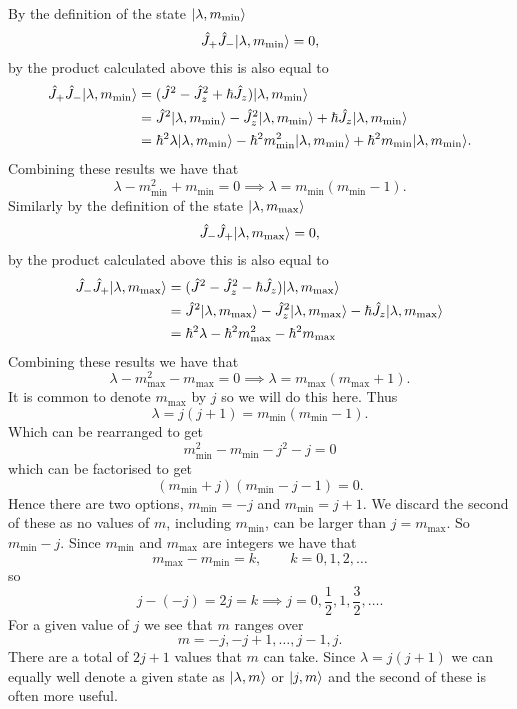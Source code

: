 By the definition of the state \(\vert {\lambda, m_{\min}} \rangle\)
\[\hat{J}_+\hat{J}_-\vert {\lambda, m_{\min}} \rangle = 0,\]
by the product calculated above this is also equal to
\begin{align*}
    \hat{J}_+\hat{J}_-\vert {\lambda, m_{\min}} \rangle &= (\hat{J}^2 - \hat{J}_z^2 + \hbar\hat{J}_z)\vert {\lambda, m_{\min}} \rangle\\
    &= \hat{J}^2\vert {\lambda, m_{\min}} \rangle - \hat{J}_z^2\vert {\lambda, m_{\min}} \rangle + \hbar\hat{J}_z\vert {\lambda, m_{\min}} \rangle\\
    &= \hbar^2\lambda\vert {\lambda, m_{\min}} \rangle - \hbar^2m_{\min}^2\vert {\lambda, m_{\min}} \rangle + \hbar^2m_{\min}\vert {\lambda, m_{\min}} \rangle.\\
\end{align*}
Combining these results we have that
\[\lambda - m_{\min}^2 + m_{\min} = 0 \implies \lambda = m_{\min}(m_{\min} - 1).\]
Similarly by the definition of the state \(\vert {\lambda, m_{\max}} \rangle\)
\[\hat{J}_-\hat{J}_+\vert {\lambda, m_{\max}} \rangle = 0,\]
by the product calculated above this is also equal to
\begin{align*}
    \hat{J}_-\hat{J}_+\vert {\lambda, m_{\max}} \rangle &= (\hat{J}^2 - \hat{J}_z^2 - \hbar\hat{J}_z)\vert {\lambda, m_{\max}} \rangle\\
    &= \hat{J}^2\vert {\lambda, m_{\max}} \rangle - \hat{J}_z^2\vert {\lambda, m_{\max}} \rangle - \hbar\hat{J}_z\vert {\lambda, m_{\max}} \rangle\\
    &= \hbar^2\lambda - \hbar^2m_{\max}^2 - \hbar^2m_{\max}
\end{align*}
Combining these results we have that
\[\lambda - m_{\max}^2 - m_{\max} = 0 \implies \lambda = m_{\max}(m_{\max} + 1).\]
It is common to denote \(m_{\max}\) by \(j\) so we will do this here.
Thus
\[\lambda = j(j + 1) = m_{\min}(m_{\min} - 1).\]
Which can be rearranged to get
\[m_{\min}^2 - m_{\min} - j^2 - j = 0\]
which can be factorised to get
\[(m_{\min} + j)(m_{\min} - j - 1) = 0.\]
Hence there are two options, \(m_{\min} = -j\) and \(m_{\min} = j + 1\).
We discard the second of these as no values of \(m\), including \(m_{\min}\), can be larger than \(j = m_{\max}\).
So \(m_{\min} -j\).
Since \(m_{\min}\) and \(m_{\max}\) are integers we have that
\[m_{\max} - m_{\min} = k,\qquad k = 0, 1, 2, \dotsc\]
so
\[j - (-j) = 2j = k \implies j = 0, \frac{1}{2}, 1, \frac{3}{2}, \dotsc.\]
For a given value of \(j\) we see that \(m\) ranges over
\[m = -j, -j + 1, \dotsc, j - 1, j.\]
There are a total of \(2j + 1\) values that \(m\) can take.
Since \(\lambda = j(j + 1)\) we can equally well denote a given state as \(\vert {\lambda, m} \rangle\) or \(\vert {j, m} \rangle\) and the second of these is often more useful.
